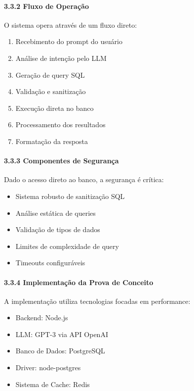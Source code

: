 \documentclass[
]{article}
\providecommand{\tightlist}{%
  \setlength{\itemsep}{0pt}\setlength{\parskip}{0pt}}
\begin{document}
\paragraph{3.3.2 Fluxo de Operação}\label{fluxo-de-operauxe7uxe3o-1}

O sistema opera através de um fluxo direto:

\begin{enumerate}
\def\labelenumi{\arabic{enumi}.}
\tightlist
\item
  Recebimento do prompt do usuário
\item
  Análise de intenção pelo LLM
\item
  Geração de query SQL
\item
  Validação e sanitização
\item
  Execução direta no banco
\item
  Processamento dos resultados
\item
  Formatação da resposta
\end{enumerate}

\paragraph{3.3.3 Componentes de
Segurança}\label{componentes-de-seguranuxe7a-2}

Dado o acesso direto ao banco, a segurança é crítica:

\begin{itemize}
\tightlist
\item
  Sistema robusto de sanitização SQL
\item
  Análise estática de queries
\item
  Validação de tipos de dados
\item
  Limites de complexidade de query
\item
  Timeouts configuráveis
\end{itemize}

\paragraph{3.3.4 Implementação da Prova de
Conceito}\label{implementauxe7uxe3o-da-prova-de-conceito-2}

A implementação utiliza tecnologias focadas em performance:

\begin{itemize}
\tightlist
\item
  Backend: Node.js
\item
  LLM: GPT-3 via API OpenAI
\item
  Banco de Dados: PostgreSQL
\item
  Driver: node-postgres
\item
  Sistema de Cache: Redis
\end{itemize}
\end{document}
